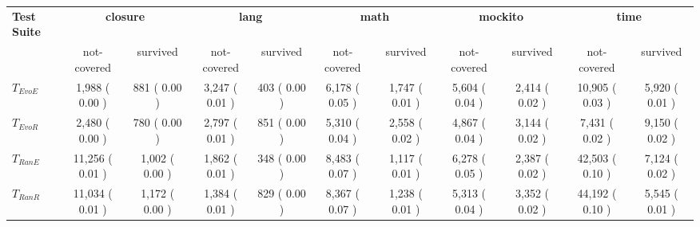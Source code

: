 \begin{tabular}{ l | cc | cc | cc | cc | cc }
\hline 
\textbf{Test Suite}& \multicolumn{2}{c}{\textbf{closure}}& \multicolumn{2}{c}{\textbf{lang}}& \multicolumn{2}{c}{\textbf{math}}& \multicolumn{2}{c}{\textbf{mockito}}& \multicolumn{2}{c}{\textbf{time}} \\ 
 & not-covered & survived & not-covered & survived & not-covered & survived & not-covered & survived & not-covered & survived \\ 
\hline 
$T_{EvoE}$&  1,988 ( 0.00 )&  881 ( 0.00 )&  3,247 ( 0.01 )&  403 ( 0.00 )&  6,178 ( 0.05 )&  1,747 ( 0.01 )&  5,604 ( 0.04 )&  2,414 ( 0.02 )&  10,905 ( 0.03 )&  5,920 ( 0.01 ) \\ 
$T_{EvoR}$&  2,480 ( 0.00 )&  780 ( 0.00 )&  2,797 ( 0.01 )&  851 ( 0.00 )&  5,310 ( 0.04 )&  2,558 ( 0.02 )&  4,867 ( 0.04 )&  3,144 ( 0.02 )&  7,431 ( 0.02 )&  9,150 ( 0.02 ) \\ 
$T_{RanE}$&  11,256 ( 0.01 )&  1,002 ( 0.00 )&  1,862 ( 0.01 )&  348 ( 0.00 )&  8,483 ( 0.07 )&  1,117 ( 0.01 )&  6,278 ( 0.05 )&  2,387 ( 0.02 )&  42,503 ( 0.10 )&  7,124 ( 0.02 ) \\ 
$T_{RanR}$&  11,034 ( 0.01 )&  1,172 ( 0.00 )&  1,384 ( 0.01 )&  829 ( 0.00 )&  8,367 ( 0.07 )&  1,238 ( 0.01 )&  5,313 ( 0.04 )&  3,352 ( 0.02 )&  44,192 ( 0.10 )&  5,545 ( 0.01 ) \\ 
\hline 
\end{tabular}
